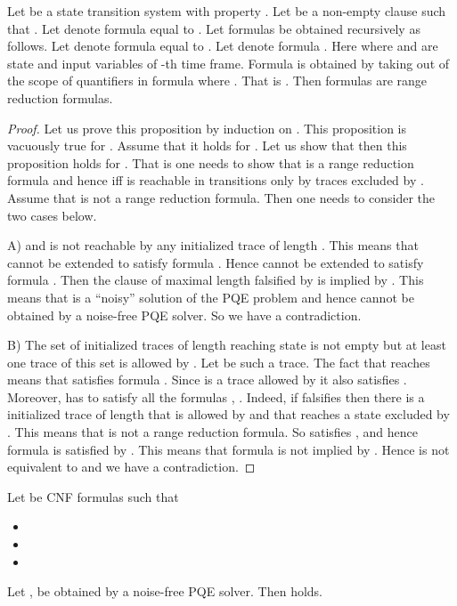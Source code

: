 \begin{proposition}
Let  be a state transition system with property . Let 
be a non-empty clause such that .  Let 
denote formula equal to . Let formulas  be obtained
recursively as follows.  Let  denote formula equal to .
Let  denote formula . Here  where  and  are state and input
variables of -th time frame.  Formula  is obtained by
taking  out of the scope of quantifiers in
formula  where .  That is
.  Then formulas  are range
reduction formulas.
\end{proposition}
\begin{proof}
Let us prove this proposition by induction on . This proposition is
vacuously true for . Assume that it holds for . Let
us show that then this proposition holds for .  That is one needs
to show that  is a range reduction formula and hence
 iff  is reachable in  transitions only
by traces excluded by .  Assume that  is not a range
reduction formula.  Then one needs to consider the two cases below.

A)  and  is not reachable by any
initialized trace of length . This means that  cannot be
extended to satisfy formula .
Hence  cannot be extended to satisfy formula . Then the clause of maximal length falsified
by  is implied by . This means that  is a
``noisy'' solution of the PQE problem and hence cannot be obtained by
a noise-free PQE solver. So we have a contradiction.

B) The set of initialized traces of length  reaching
state  is not empty but at least one trace of this set is
allowed by . Let  be such a trace. The fact that 
reaches  means that  satisfies formula . Since  is a trace allowed by  it also
satisfies . Moreover,  has to satisfy all the formulas ,
. Indeed, if  falsifies  then there is a
initialized trace of length  that is allowed by  and that
reaches a state excluded by . This means that  is not a
range reduction formula.  So  satisfies , and
hence formula  is satisfied by . This
means that formula  is not implied by . Hence 
is not equivalent to
 and we have a contradiction.
\end{proof}
\begin{lemma}
\label{lemma:impl}
Let  be  CNF formulas such that
\begin{itemize}
\item 
\item 
\item {}
\end{itemize}
Let , be obtained by a noise-free PQE solver.
Then  holds.
\end{lemma}
